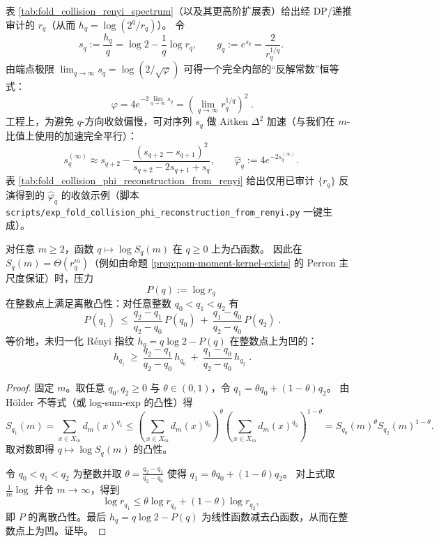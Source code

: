 \begin{remark}\label{rem:pom-recover-phi-from-collision-spectrum}
表 \ref{tab:fold_collision_renyi_spectrum}（以及其更高阶扩展表）给出经 DP/递推审计的 \(r_q\)（从而 \(h_q=\log(2^q/r_q)\)）。
令
\[
s_q:=\frac{h_q}{q}=\log 2-\frac{1}{q}\log r_q,
\qquad
g_q:=e^{s_q}=\frac{2}{r_q^{1/q}}.
\]
由端点极限 \(\lim_{q\to\infty}s_q=\log(2/\sqrt{\varphi})\) 可得一个完全内部的“反解常数”恒等式：
\[
\boxed{\;
\varphi
=4e^{-2\lim_{q\to\infty}s_q}
=\left(\lim_{q\to\infty}r_q^{1/q}\right)^2\; }.
\]
工程上，为避免 \(q\)-方向收敛偏慢，可对序列 \(s_q\) 做 Aitken \(\Delta^2\) 加速（与我们在 \(m\)-比值上使用的加速完全平行）：
\[
s_q^{(\infty)}
\approx
s_{q+2}-\frac{(s_{q+2}-s_{q+1})^2}{s_{q+2}-2s_{q+1}+s_q},
\qquad
\widehat\varphi_q:=4e^{-2s_q^{(\infty)}}.
\]
表 \ref{tab:fold_collision_phi_reconstruction_from_renyi} 给出仅用已审计 \(\{r_q\}\) 反演得到的 \(\widehat\varphi_q\) 的收敛示例（脚本 \texttt{scripts/exp\_fold\_collision\_phi\_reconstruction\_from\_renyi.py} 一键生成）。
\end{remark}



\begin{proposition}[压力的凸性与指纹的凹性]\label{prop:pom-pressure-convexity}
对任意 \(m\ge 2\)，函数 \(q\mapsto \log S_q(m)\) 在 \(q\ge 0\) 上为凸函数。
因此在 \(S_q(m)=\Theta(r_q^m)\)（例如由命题 \ref{prop:pom-moment-kernel-exists} 的 Perron 主尺度保证）时，压力
\[
P(q):=\log r_q
\]
在整数点上满足离散凸性：对任意整数 \(q_0<q_1<q_2\) 有
\[
\boxed{\;
P(q_1)\ \le\ \frac{q_2-q_1}{q_2-q_0}\,P(q_0)\ +\ \frac{q_1-q_0}{q_2-q_0}\,P(q_2)\; }.
\]
等价地，未归一化 Rényi 指纹 \(h_q=q\log 2-P(q)\) 在整数点上为凹的：
\[
\boxed{\;
h_{q_1}\ \ge\ \frac{q_2-q_1}{q_2-q_0}\,h_{q_0}\ +\ \frac{q_1-q_0}{q_2-q_0}\,h_{q_2}\; }.
\]
\end{proposition}
\begin{proof}
固定 \(m\)。取任意 \(q_0,q_2\ge 0\) 与 \(\theta\in(0,1)\)，令 \(q_1=\theta q_0+(1-\theta)q_2\)。
由 Hölder 不等式（或 log-sum-exp 的凸性）得
\[
S_{q_1}(m)=\sum_{x\in X_m}d_m(x)^{q_1}
\le
\left(\sum_{x\in X_m}d_m(x)^{q_0}\right)^{\theta}
\left(\sum_{x\in X_m}d_m(x)^{q_2}\right)^{1-\theta}
=S_{q_0}(m)^{\theta}S_{q_2}(m)^{1-\theta}.
\]
取对数即得 \(q\mapsto \log S_q(m)\) 的凸性。
\par
令 \(q_0<q_1<q_2\) 为整数并取
\(
\theta=\frac{q_2-q_1}{q_2-q_0}
\)
使得 \(q_1=\theta q_0+(1-\theta)q_2\)。
对上式取 \(\frac{1}{m}\log\) 并令 \(m\to\infty\)，得到
\[
\log r_{q_1}\le \theta\log r_{q_0}+(1-\theta)\log r_{q_2},
\]
即 \(P\) 的离散凸性。最后 \(h_q=q\log 2-P(q)\) 为线性函数减去凸函数，从而在整数点上为凹。证毕。
\end{proof}


